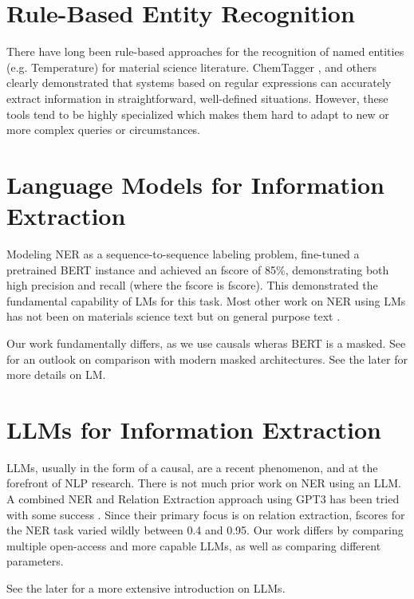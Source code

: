 

\section{Rule-Based Entity Recognition}
There have long been rule-based approaches for the recognition of named entities (e.g. Temperature) for material science literature.
ChemTagger \cite{hawizy_chemicaltagger_2011}, and others \cite{beard_comparative_2019, huang_database_2020}
clearly demonstrated that systems based on regular expressions can accurately extract information in straightforward, well-defined situations.
However, these tools tend to be highly specialized which makes them hard to adapt to new or more complex queries or circumstances.


\section{Language Models for Information Extraction}
Modeling \gls{NER} as a sequence-to-sequence labeling problem, \cite{zhao_finetuning_2021} fine-tuned a pretrained \gls{BERT} instance and achieved an \gls{fscore} of 85\%, demonstrating both high precision and recall (where the \gls{fscore} is \glsdesc{fscore}).
This demonstrated the fundamental capability of \glspl{LM} for this task.
Most other work on \gls{NER} using \glspl{LM} has not been on materials science text but on general purpose text \cite{li_survey_2022}.

Our work fundamentally differs, as we use \glspl{causal} wheras \gls{BERT} is a \gls{masked}. See  for an outlook on comparison with modern \gls{masked} architectures. See the later  for more details on \acrlong{LM}.

\section{LLMs for Information Extraction}
\glspl{LLM}, usually in the form of a \gls{causal}, are a recent phenomenon, and at the forefront of \gls{NLP} research.
There is not much prior work on \gls{NER} using an \gls{LLM}.
A combined \gls{NER} and Relation Extraction approach using \gls{GPT3} has been tried with some success \cite{dunn_structured_2022}.
Since their primary focus is on relation extraction, \glspl{fscore} for the \gls{NER} task varied wildly between 0.4 and 0.95.
Our work differs by comparing multiple open-access and more capable \glspl{LLM}, as well as comparing different parameters.

See the later  for a more extensive introduction on \glspl{LLM}. 

